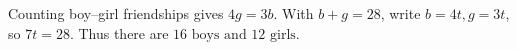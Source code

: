 Counting boy--girl friendships gives $4g=3b$. With $b+g=28$, write $b=4t,g=3t$, so $7t=28$. Thus there are $\boxed{16\text{ boys and }12\text{ girls}}$.
